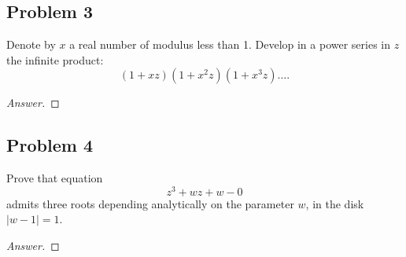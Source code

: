 \documentclass[12pt]{article}
\theoremstyle{definition}
\begin{document}
\subsection{Problem 3}
Denote by $x$ a real number of modulus less than 1. Develop in a power series in $z$ the infinite product:
\[
    (1 + xz)(1 + x^2z)(1 + x^3z) \dotsc .
\]
\begin{proof}[Answer]
    
\end{proof}
\subsection{Problem 4}
Prove that equation 
\[
    z^3 + wz + w - 0
\]
admits three roots depending analytically on the parameter $w$, in the disk $|w-1| = 1$.
\begin{proof}[Answer]
    
\end{proof}
\end{document}

